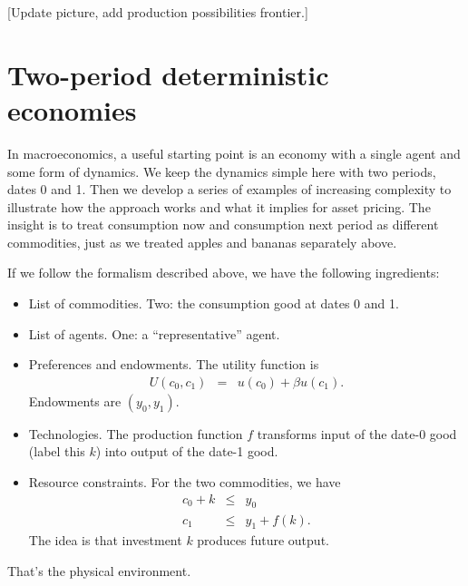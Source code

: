 \documentclass[11pt]{article}
\begin{document}
[Update picture, add production possibilities frontier.]



\section{Two-period deterministic economies}

In macroeconomics, a useful starting point is an
economy with a single agent and some form of dynamics.
We keep the dynamics simple here with two periods,
dates 0 and 1.
Then we develop a series of examples of increasing complexity
to illustrate how the approach works and what it implies for asset pricing.
The insight is to treat consumption now and consumption next period
as different commodities, just as we treated apples and bananas separately above.

If we follow the formalism described above, we have the following ingredients:
%
\begin{itemize}
\item List of commodities.  Two:  the consumption good at dates 0 and 1.
\item List of agents.  One: a ``representative'' agent.
\item Preferences and endowments.  The utility function is
\begin{eqnarray*}
    U(c_0,c_1) &=& u(c_0) + \beta u(c_1) .
\end{eqnarray*}
Endowments are $(y_0,y_1)$.
\item Technologies.  The production function $f$ transforms input of the date-0 good
(label this $k$)
into output of the date-1 good.
\item Resource constraints.  For the two commodities,
we have
\begin{eqnarray*}
    c_0 + k &\leq& y_0 \\
    c_1 &\leq&  y_1 + f(k) .
\end{eqnarray*}
The idea is that investment $k$ produces future output.
\end{itemize}
That's the physical environment.

\end{document}
